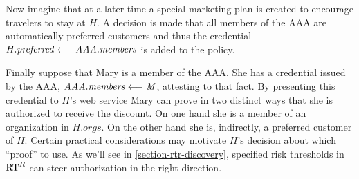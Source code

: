 Now imagine that at a later time a special marketing plan is created to
encourage travelers to stay at $H$. A decision is made that all
members of the AAA are automatically preferred customers and thus the
credential
$H.\mathit{preferred} \stackrel{}{\longleftarrow} \mathit{AAA}.\mathit{members}$ is added
to the policy.

Finally suppose that Mary is a member of the AAA. She has a credential
issued by the AAA,
$\mathit{AAA}.\mathit{members} \stackrel{}{\longleftarrow} \mathit{M}$, attesting to
that fact. By presenting this credential to $H$'s web service Mary can
prove in two distinct ways that she is authorized to receive the
discount. On one hand she is a member of an organization in
$H.\mathit{orgs}$. On the other hand she is, indirectly, a preferred
customer of $H$.  Certain practical considerations may motivate $H$'s
decision about which ``proof'' to use.  As we'll see in
\autoref{section-rtr-discovery}, specified risk thresholds in $\text{RT}^R$
can steer authorization in the right direction.
